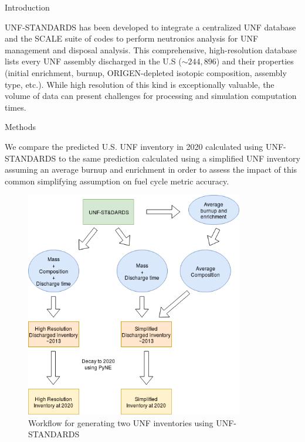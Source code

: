 \documentclass[final]{beamer}
\newlength{\onecolwid}
\newlength{\threecolwid}
\begin{document}
\begin{frame}[t]
\begin{columns}[t,totalwidth=\threecolwid]
\begin{column}{\onecolwid}
\begin{block}{Introduction}

\gls{UNF-STANDARDS} has been developed to integrate
a centralized \gls{UNF} database \cite{peterson_used_2013} and the SCALE suite of codes \cite{noauthor_scale_nodate} to
perform neutronics analysis for
\gls{UNF} management and disposal analysis.
This comprehensive, high-resolution database lists every \gls{UNF} assembly discharged 
in the U.S ($\sim244,896$) and their properties
(initial enrichment, burnup, ORIGEN-depleted isotopic composition, assembly type, etc.).
While high resolution of this kind is exceptionally valuable, the volume of data can 
present challenges for processing and simulation computation times.


\end{block}


\begin{block}{Methods}

We compare the predicted U.S. \gls{UNF} inventory in 2020 calculated using
\gls{UNF-STANDARDS} to the same prediction calculated using a simplified \gls{UNF} 
inventory assuming an average burnup and enrichment in order to assess the impact of this common simplifying assumption on fuel cycle metric accuracy.

\begin{figure}
    \includegraphics[width=0.85\textwidth]{../images/flow.png}
    \caption{Workflow for generating two \gls{UNF} inventories using \gls{UNF-STANDARDS}}
    \label{fig:flow}
\end{figure}


\end{block}
\end{column}
\end{columns}
\end{frame}
\end{document}
